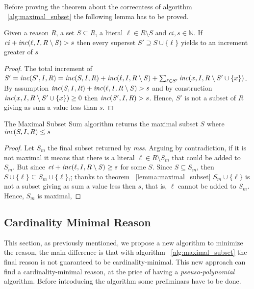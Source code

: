 Before proving the theorem about the correcntess of algorithm ~\ref{alg:maximal_subset}
the following lemma has to be proved.

\begin{lemma}
    \label{lemma:maximal_subset}
    Given a reason $R$, a set $S \subseteq R$, a literal $\ell \in R \setminus S$
    and $\mathit{ci},s \in \mathbb{N}$.
    If $\mathit{ci} +  \mathit{inc}(\ell,I,R \setminus \mathit{S}) > s$
    then every superset  $S' \supseteq S \cup \{\ell\}$ yields to 
    an increment greater of $s$
\end{lemma}

\begin{proof}
    The total increment of $S' = \mathit{inc}(S',I,R) = \mathit{inc}(S,I,R) + \mathit{inc}(\ell,I,R \setminus \mathit{S}) + 
    \sum_{\ell \in S'} \mathit{inc}(x, I, R \setminus S' \cup \{x\})$.
    By assumption $\mathit{inc}(S,I,R) + \mathit{inc}(\ell,I,R \setminus \mathit{S}) > s$  and  by construction $\mathit{inc}(x, I, R \setminus S' \cup \{x\}) \ge 0$ then 
    $\mathit{inc}(S',I,R) > s$.
    Hence, $S'$ is not a subset of $R$ giving as sum a value less than $s$.

\end{proof}

\begin{theorem}
    The Maximal Subset Sum algorithm returns the maximal subset $S$ where $\mathit{inc}(S,I,R) \le s$
\end{theorem}

\begin{proof}
    Let $S_m$ the final subset returned by \textit{mss}.
    Arguing by contradiction, if it is not maximal 
    it means that there is a literal $\ell \in R \setminus S_m$ that could be
    added to $S_m$.
    But since $\mathit{ci} +  \mathit{inc}(\ell,I,R \setminus \mathit{S}) \ge s$
    for some $S$.
    Since $S \subseteq S_m$, then $S \cup \{\ell\} \subseteq S_m \cup \{\ell\}$,;
    thanks to theorem ~\ref{lemma:maximal_subset} $S_m \cup \{\ell\}$
    is not a subset giving as sum a value less then $s$, that is, $\ell$ cannot be 
    added to $S_m$.
    Hence, $S_m$ is maximal,
\end{proof}


\subsection{Cardinality Minimal Reason}
\label{subsec:cardinality_minimal_reason}

This section, as previously mentioned, we propose a new algorithm to minimize the reason,
the main difference is that with algorithm ~\ref{alg:maximal_subset} the final reason 
is not guaranteed to be cardinality-minimal.
This new approach can find a cardinality-minimal reason, at the price of 
having a \textit{pseuso-polynomial} algorithm.
Before introducing the algorithm some preliminars have to be done.

